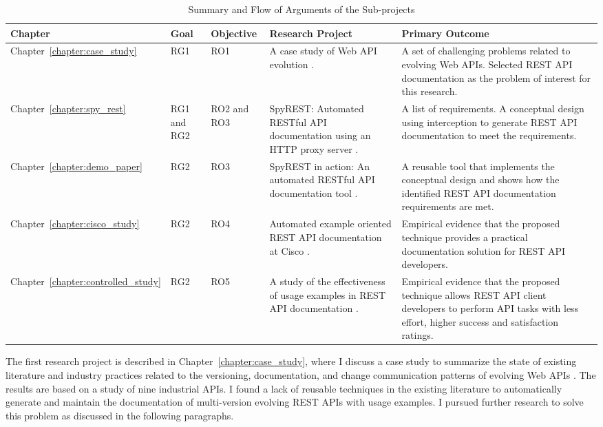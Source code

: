 \begin{table}
  \caption{Summary and Flow of Arguments of the Sub-projects}
  \begin{tabular}{|p{1.5cm}|p{1.5cm}|p{1.5cm}|p{4.5cm}|p{6cm}|}
  \hline
  Chapter & Goal & Objective & Research Project & Primary Outcome \\
  \hline
  Chapter~\ref{chapter:case_study}  & RG1 & RO1 & A case study of Web API evolution \cite{sohan2015case}. & A set of challenging problems related to evolving Web APIs. Selected REST API documentation as the problem of interest for this research. \\
  \hline
  Chapter~\ref{chapter:spy_rest} & RG1 and RG2 & RO2 and RO3 & SpyREST: Automated RESTful API documentation using an HTTP proxy server \cite{sohan2015spyrest}. & A list of requirements. A conceptual design using interception to generate REST API documentation to meet the requirements. \\
  \hline
  Chapter~\ref{chapter:demo_paper} & RG2 & RO3 & SpyREST in action: An automated RESTful API documentation tool \cite{sohan2015spyrest_tool}. & A reusable tool that implements the conceptual design and shows how the identified REST API documentation requirements are met.\\
  \hline
  Chapter~\ref{chapter:cisco_study} & RG2 & RO4 & Automated example oriented REST API documentation at Cisco \cite{sohan_cisco}. & Empirical evidence that the proposed technique provides a practical documentation solution for REST API developers.\\
  \hline
  Chapter~\ref{chapter:controlled_study} & RG2 & RO5 & A study of the effectiveness of usage examples in REST API documentation \cite{sohan_vlhcc}. & Empirical evidence that the proposed technique allows REST API client developers to perform API tasks with less effort, higher success and satisfaction ratings.\\
  \hline
\end{tabular}
\label{table:chapter_summary}
\end{table}

The first research project is described in Chapter~\ref{chapter:case_study}, where I discuss a case study to summarize the state of existing literature and industry practices related to the versioning, documentation, and change communication patterns of evolving Web APIs \cite{sohan2015case}. The results are based on a study of nine industrial APIs. I found a lack of reusable techniques in the existing literature to automatically generate and maintain the documentation of multi-version evolving REST APIs with usage examples. I pursued further research to solve this problem as discussed in the following paragraphs.

